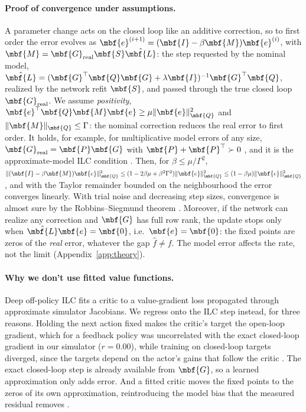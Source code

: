 \paragraph{Proof of convergence under assumptions.}
A parameter change acts on the closed loop like an additive correction, so to first order the error evolves as
$\mbf{e}^{(i+1)}=(\mbf{I}-\beta\mbf{M})\mbf{e}^{(i)}$, with $\mbf{M}=\mbf{G}_{\mathrm{real}}\mbf{S}\hat{\mbf{L}}$:
the step requested by the nominal model,
$\hat{\mbf{L}}=(\mbf{G}^\top\mbf{Q}\mbf{G}+\lambda\mbf{I})^{-1}\mbf{G}^\top\mbf{Q}$, realized by the network refit
$\mbf{S}$, and passed through the true closed loop $\mbf{G}_{\mathrm{real}}$. We assume \emph{positivity},
$\mbf{e}^\top\mbf{Q}\mbf{M}\mbf{e}\ge\mu\|\mbf{e}\|_{\mbf{Q}}^2$ and $\|\mbf{M}\|_{\mbf{Q}}\le\Gamma$: the nominal
correction reduces the real error to first order. It holds, for example, for multiplicative model errors of any size,
$\mbf{G}_{\mathrm{real}}=\mbf{P}\mbf{G}$ with $\mbf{P}+\mbf{P}^\top\succ0$ \citep{harte2005inverse}, and it is the
approximate-model ILC condition \citep{bristow2006survey}. Then, for $\beta\le\mu/\Gamma^2$,
$\|(\mbf{I}-\beta\mbf{M})\mbf{e}\|_{\mbf{Q}}^2\le(1-2\beta\mu+\beta^2\Gamma^2)\|\mbf{e}\|_{\mbf{Q}}^2\le(1-\beta\mu)\|\mbf{e}\|_{\mbf{Q}}^2$,
and with the Taylor remainder bounded on the neighbourhood the error converges linearly. With trial noise and
decreasing step sizes, convergence is almost sure by the Robbins--Siegmund theorem \citep{robbins1971convergence}.
Moreover, if the network can realize any correction and $\mbf{G}$ has full row rank, the update stops only when
$\hat{\mbf{L}}\mbf{e}=\mbf{0}$, i.e.\ $\mbf{e}=\mbf{0}$: the fixed points are zeros of the \emph{real} error,
whatever the gap $\hat f\neq f$. The model error affects the rate, not the limit (Appendix~\ref{app:theory}).

\paragraph{Why we don't use fitted value functions.}
Deep off-policy ILC \citep{gurumurthy2023deepilc} fits a critic to a value-gradient loss propagated through
approximate simulator Jacobians. We regress onto the ILC step instead, for three reasons. Holding the next action
fixed makes the critic's target the open-loop gradient, which for a feedback policy was uncorrelated with the exact
closed-loop gradient in our simulator ($r=0.00$), while training on closed-loop targets diverged, since the targets
depend on the actor's gains that follow the critic \citep[Sec.~11.3]{sutton2018rl}. The exact closed-loop step is
already available from $\mbf{G}$, so a learned approximation only adds error. And a fitted critic moves the fixed
points to the zeros of its own approximation, reintroducing the model bias that the measured residual removes
\citep{abbeel2006inaccurate}.

